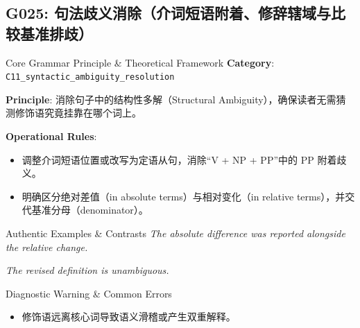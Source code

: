 \subsection{G025: 句法歧义消除（介词短语附着、修辞辖域与比较基准排歧）}\label{sec:rule:G025}
\begin{ConceptBox}{Core Grammar Principle \& Theoretical Framework}
\textbf{Category}: \texttt{C11\_syntactic\_ambiguity\_resolution}\par\vspace{3pt}
\textbf{Principle}: 消除句子中的结构性多解（Structural Ambiguity），确保读者无需猜测修饰语究竟挂靠在哪个词上。\par\vspace{4pt}
\textbf{Operational Rules}:
\begin{itemize}[leftmargin=1.5em, itemsep=1pt]
  \item 调整介词短语位置或改写为定语从句，消除“V + NP + PP”中的 PP 附着歧义。
  \item 明确区分绝对差值（in absolute terms）与相对变化（in relative terms），并交代基准分母（denominator）。
\end{itemize}
\end{ConceptBox}
\begin{ExampleBox}{Authentic Examples \& Contrasts}
\textit{The absolute difference was reported alongside the relative change.}\par\vspace{2pt}
\textit{The revised definition is unambiguous.}\par\vspace{2pt}
\end{ExampleBox}
\begin{TipBox}{Diagnostic Warning \& Common Errors}
\begin{itemize}[leftmargin=1.5em, itemsep=1pt]
  \item 修饰语远离核心词导致语义滑稽或产生双重解释。
\end{itemize}
\end{TipBox}
\vspace{6pt}
